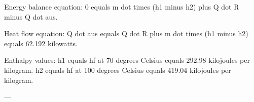 Energy balance equation:  
0 equals m dot times (h1 minus h2) plus Q dot R minus Q dot aus.  

Heat flow equation:  
Q dot aus equals Q dot R plus m dot times (h1 minus h2) equals 62.192 kilowatts.  

Enthalpy values:  
h1 equals hf at 70 degrees Celsius equals 292.98 kilojoules per kilogram.  
h2 equals hf at 100 degrees Celsius equals 419.04 kilojoules per kilogram.  

---